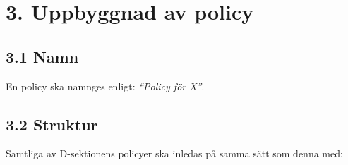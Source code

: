 \documentclass[]{dsekkallelse}
\begin{document}
\section{3. Uppbyggnad av policy}

\subsection{3.1 Namn}

En policy ska namnges enligt: \textit{``Policy för X''}.

\subsection{3.2 Struktur}

Samtliga av D-sektionens policyer ska inledas på samma sätt som denna med:
\end{document}
